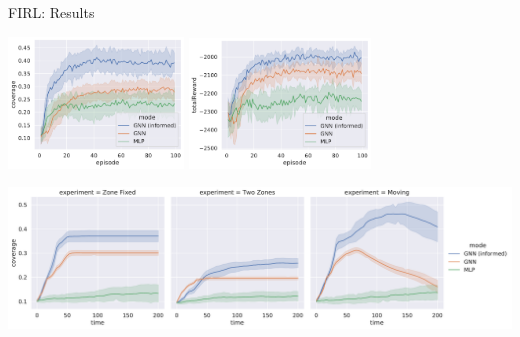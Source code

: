 \documentclass[presentation, 8pt,169]{beamer}\mode<presentation>{\usetheme{AMSBolognaFC}}
\begin{document}
\begin{frame}[allowframebreaks]{FIRL: Results}
  
\begin{center}
  \includegraphics[width=0.35\textwidth]{img/coverage-in-time.pdf}
  \includegraphics[width=0.36\textwidth]{img/reward-in-time.pdf}
\end{center}
\begin{center}
  \end{center}
\includegraphics[width=\textwidth]{img/coverage-test.pdf}

\end{frame}
\end{document}
